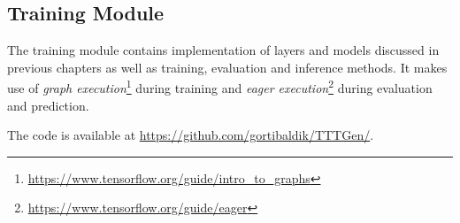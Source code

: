\subsection{Training Module}

The training module contains implementation of layers and models discussed in previous chapters as well as training, evaluation and inference methods. It makes use of \emph{graph execution}\footnote{\url{https://www.tensorflow.org/guide/intro_to_graphs}} during training and \emph{eager execution}\footnote{\url{https://www.tensorflow.org/guide/eager}} during evaluation and prediction.

The code is available at \url{https://github.com/gortibaldik/TTTGen/}.